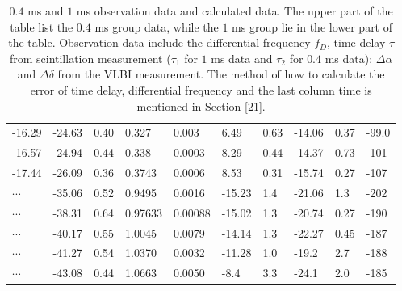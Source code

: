 \documentclass[useAMS,usenatbib]{mn2e}
\begin{document}
\begin{table}
\begin{tabular}{llllllllll}
-16.29   &-24.63                            & 0.40       & 0.327  & 0.003          & 6.49    & 0.63                                     & -14.06    & 0.37       &-99.0                                \\

-16.57  &-24.94                            & 0.44      & 0.338 & 0.0003         & 8.29    & 0.44                                     & -14.37    & 0.73      &-101                                \\

-17.44   &-26.09                            & 0.36      & 0.3743 & 0.0006         & 8.53    & 0.31                                     & -15.74    & 0.27      &-107                               
\\ \hline
$\cdots$&         -35.06                           & 0.52                               & 0.9495               & 0.0016                              & -15.23  & 1.4                                     & -21.06   & 1.3   &-202                                   \\

$\cdots$ & -38.31                           & 0.64                               & 0.97633              & 0.00088                             & -15.02  & 1.3                                    & -20.74   & 0.27  &-190                                    \\
$\cdots$ & -40.17                           & 0.55                               & 1.0045              & 0.0079                             & -14.14  & 1.3                                    & -22.27   & 0.45  &-187                                   \\

$\cdots$ & -41.27                           & 0.54                               & 1.0370              & 0.0032                              & -11.28  & 1.0                                     & -19.2   & 2.7   &-188                                   \\

$ \cdots$ & -43.08                           & 0.44                               & 1.0663              & 0.0050                              & -8.4   & 3.3                                      & -24.1   & 2.0   &-185   \\
 \hline                                 
\end{tabular}
\caption{ $0.4$ ms and $1$ ms observation data and calculated data. 
The upper part of the table list the $0.4$ ms group data, while the $1$ ms group lie in the lower part of the table. 
Observation data include the differential frequency $f_D$, time delay $\tau$ from scintillation measurement ($\tau_1$ for $1$ ms data and $\tau_2$ for $0.4$ ms data); $\Delta\alpha$ and $\Delta\delta$ from the VLBI measurement. The method of how to calculate the error of time delay, differential frequency and the last column time is mentioned in Section \ref{21}.}
\label{table:apex}
\end{table}
\end{document}
